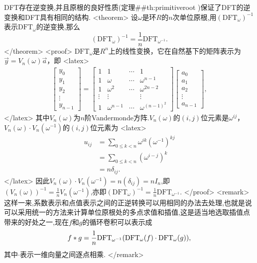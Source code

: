 DFT存在逆变换,并且原根的良好性质(定理##th:primitiveroot )保证了DFT的逆变换和DFT具有相同的结构.
<theorem>
设$\omega$是环$R$的$n$次单位原根,用$(\mathrm{DFT}_\omega)^{-1}$表示$\mathrm{DFT}_\omega$的逆变换,那么$$(\mathrm{DFT}_\omega)^{-1}=\frac{1}{n}\mathrm{DFT}_{\omega^{-1}}.$$
</theorem>
<proof>
$\mathrm{DFT}_\omega$是$R^n$上的线性变换，它在自然基下的矩阵表示为$\vec{y}=V_n(\omega)\vec{a}$，即
<latex>
\begin{align*}
\begin{bmatrix}
y_0\\
y_1\\
y_2\\
\vdots\\
y_{n-1}
\end{bmatrix}
=
\begin{bmatrix}
1 & 1 & \cdots & 1\\
1 & \omega & \cdots & \omega^{n-1}\\
1 & \omega^2 & \cdots & \omega^{2n-2}\\
\vdots & \vdots & & \vdots\\
1 & \omega^{n-1} & \cdots & \omega^{(n-1)^2}
\end{bmatrix}
\begin{bmatrix}
a_0\\
a_1\\
a_2\\
\vdots\\
a_{n-1}
\end{bmatrix},
\end{align*}
</latex>
其中$V_n(\omega)$为$n$阶Vandermonde方阵.$V_n(\omega)$的$(i, j)$位元素是$\omega^{ij}$，$V_n(\omega)\cdot V_n(\omega^{-1})$的$(i, j)$位元素为
<latex>
\begin{align*}
u_{ij}&=\sum_{0\le k<n}\omega^{ik}(\omega^{-1})^{kj}\\
&=\sum_{0\le k<n}(\omega^{i-j})^k\\
&=n\delta_{ij}.
\end{align*}
</latex>
因此$V_n(\omega)\cdot V_n(\omega^{-1})=n(\delta_{ij})=nI_n$,即$(V_n(\omega))^{-1}=\frac{1}{n}V_n(\omega^{-1})$,亦即$(\mathrm{DFT}_\omega)^{-1}=\frac{1}{n}\mathrm{DFT}_{\omega^{-1}}$.
</proof>
<remark>
这样一来,系数表示和点值表示之间的正逆转换可以用相同的办法去处理,也就是说可以采用统一的方法来计算单位原根处的多点求值和插值,这是适当地选取插值点带来的好处之一,现在$f$和$g$的循环卷积可以表示成$$f*g={1\over n}\mathrm{DFT}_{\omega^{-1}}(\mathrm{DFT}_\omega(f)\cdot \mathrm{DFT}_\omega(g)),$$其中$\cdot$表示一维向量之间逐点相乘.
</remark>

